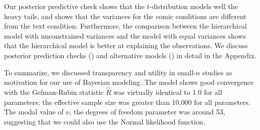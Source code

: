 



Our posterior predictive check shows that the $t$-distribution models well the heavy tails, and shows that the variances for the comic conditions are different from the text condition. Furthermore, the comparison between the hierarchical model with unconstrained variances and the model with equal variances shows that the hierarchical model is better at explaining the observations. We discuss posterior prediction checks () and alternative models () in detail in the Appendix. 

To summarize, we discussed transparency and utility in small-$n$ studies as motivation for our use of Bayesian modeling. The model shows good convergence with the Gelman-Rubin statistic $\hat{R}$ was virtually identical to 1.0 for all parameters; the effective sample size was greater than 10,000 for all parameters. The modal value of $\nu$, the degrees of freedom parameter was around 53, suggesting that we could also use the Normal likelihood function. 
